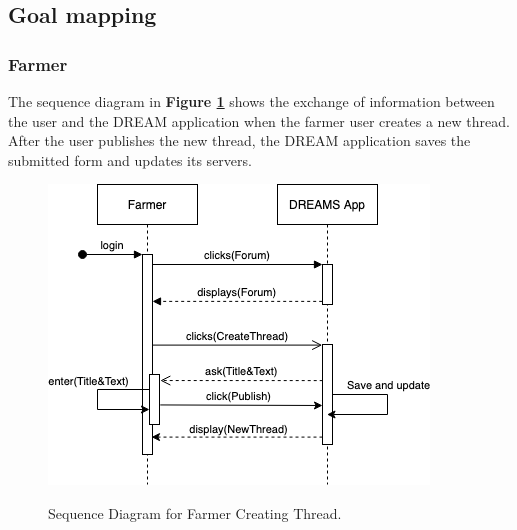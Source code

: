 %

% 
\subsection{Goal mapping}


\subsubsection{Farmer}

\begin{flushleft}
The sequence diagram in \textbf{Figure \ref{fig:farmerSeqNewThread}} shows the exchange of information between the user and the DREAM application when the farmer user creates a new thread. After the user publishes the new thread, the DREAM application saves the submitted form and updates its servers.
\end{flushleft}

\begin{figure}[hbt!]
\centering
\includegraphics[scale=0.6]{Files/sequence_disgrams/thePNGs/farmer_createThread.png}\\
\caption{\label{fig:farmerSeqNewThread}Sequence Diagram for Farmer Creating Thread.}
\end{figure}


